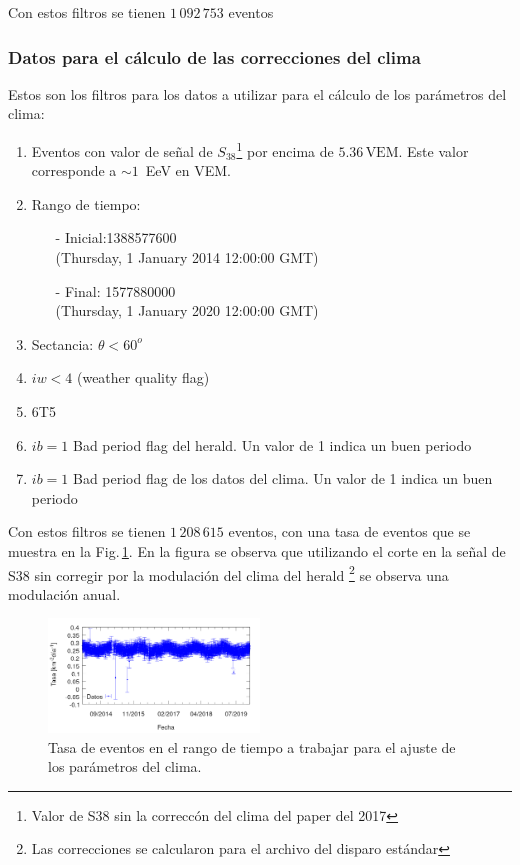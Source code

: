 Con estos filtros se tienen $1\,092\,753$ eventos

\subsubsection{Datos para el cálculo de las correcciones del clima}

Estos son los filtros para los datos a utilizar para el cálculo de los parámetros del clima:

\begin{enumerate}
	\item Eventos con valor de señal de $S_{38}$\footnote{Valor de S38 sin la correccón del clima del paper del 2017} por encima de  $5.36\,\text{VEM}$. Este valor corresponde a $\sim 1\,$ EeV  en VEM.
	\item Rango de tiempo:
	\begin{itemize}
		\item[-] Inicial:1388577600 \\ (Thursday, 1 January 2014 12:00:00 GMT)
		\item[-] Final: 1577880000  \\ (Thursday, 1 January 2020 12:00:00 GMT)
	\end{itemize}
	\item Sectancia:  $\theta < 60^o$
	\item $iw<4$ (weather quality flag)
	\item 6T5
	\item $ib=1$ Bad period flag del herald.  Un valor de 1 indica un buen periodo
	\item $ib=1$ Bad period flag de los datos del clima. Un valor de 1 indica un buen periodo
\end{enumerate}


Con estos filtros se tienen $1\,208\,615$ eventos, con una tasa de eventos que se muestra en la Fig.\,\ref{tasa_total_diaria_ajuste_weather}. En la figura se observa que utilizando el corte en la señal de S38 sin corregir por la modulación del clima del herald \footnote{Las correcciones se calcularon para el archivo del disparo estándar} se observa una modulación anual.

\begin{figure}[H]
	\centering
	\includegraphics[width=0.5\textwidth]{rate_total_ajuste_weather.png}
	\caption{Tasa  de eventos en el rango de tiempo a trabajar para el ajuste de los parámetros del clima.}
	\label{tasa_total_diaria_ajuste_weather}
\end{figure}


